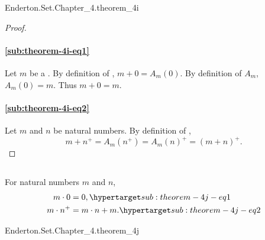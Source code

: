 \documentclass{report}
\begin{document}
    {Enderton.Set.Chapter\_4.theorem\_4i}



  \begin{proof}

    \paragraph{\eqref{sub:theorem-4i-eq1}}%

      Let $m$ be a .
      By definition of , $m + 0 = A_m(0)$.
      By definition of $A_m$, $A_m(0) = m$.
      Thus $m + 0 = m$.

    \paragraph{\eqref{sub:theorem-4i-eq2}}%

      Let $m$ and $n$ be natural numbers.
      By definition of ,
        $$m + n^+ = A_m(n^+) = A_m(n)^+ = (m + n)^+.$$

  \end{proof}

\subsection{}

  \begin{theorem}[4J]
    For natural numbers $m$ and $n$,
      \begin{align}
        m \cdot 0 & = 0, \hyperlabel{sub:theorem-4j-eq1} \\
        m \cdot n^+ & = m \cdot n + m. \hyperlabel{sub:theorem-4j-eq2}
      \end{align}
  \end{theorem}

    {Enderton.Set.Chapter\_4.theorem\_4j}


\end{document}
